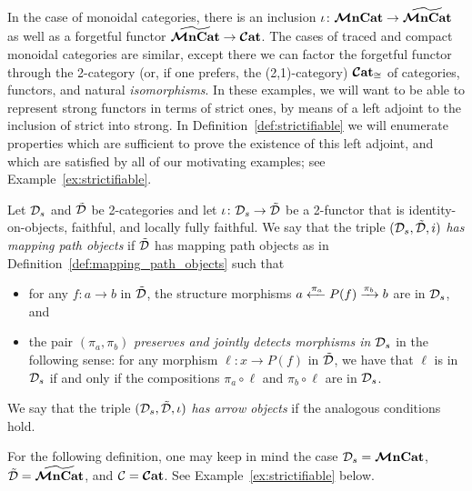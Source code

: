 \documentclass[11pt,oneside,article]{memoir}
\begin{document}
In the case of monoidal categories, there is an inclusion $\iota\colon\bm{\mathcal{M}}\mathbf{nCat}\to\widetilde{\bm{\mathcal{M}}\mathbf{nCat}}$ as
well as a forgetful functor $\widetilde{\bm{\mathcal{M}}\mathbf{nCat}}\to\bm{\mathcal{C}}\mathbf{at}$. The cases of traced and compact monoidal
categories are similar, except there we can factor the forgetful functor through the 2-category (or,
if one prefers, the (2,1)-category) $\bm{\mathcal{C}}\mathbf{at}_{\cong}$ of categories, functors, and natural
\emph{isomorphisms}. In these examples, we will want to be able to represent strong functors in
terms of strict ones, by means of a left adjoint to the inclusion of strict into strong. In
Definition~\ref{def:strictifiable} we will enumerate properties which are sufficient to prove the
existence of this left adjoint, and which are satisfied by all of our motivating examples; see
Example~\ref{ex:strictifiable}.

\begin{definition}
      \label{def:preserve_jdetect_strictness}
   Let $\mathcal{D}_s$ and $\tilde{\mathcal{D}}$ be 2-categories and let $\iota\colon\mathcal{D}_s\to\tilde{\mathcal{D}}$ be a
   2-functor that is identity-on-objects, faithful, and locally fully faithful. We say that the
   triple $(\mathcal{D}_s,\tilde{\mathcal{D}},i)$ \emph{has mapping path objects} if $\tilde{\mathcal{D}}$ has mapping path
   objects as in Definition~\ref{def:mapping_path_objects} such that
   \begin{itemize}
      \item for any $f\colon a\to b$ in $\tilde{\mathcal{D}}$, the structure morphisms
         $a\xleftarrow{\pi_a}P(f)\xrightarrow{\pi_b}b$ are in $\mathcal{D}_s$, and
      \item the pair $(\pi_a,\pi_b)$ \emph{preserves and jointly detects morphisms in $\mathcal{D}_s$} in
         the following sense: for any morphism $\ell\colon x\to P(f)$ in $\tilde{\mathcal{D}}$, we have that
         $\ell$ is in $\mathcal{D}_s$ if and only if the compositions $\pi_a\circ\ell$ and
         $\pi_b\circ\ell$ are in $\mathcal{D}_s$.
   \end{itemize}
   We say that the triple $(\mathcal{D}_s,\tilde{\mathcal{D}},\iota)$ \emph{has arrow objects} if the analogous
   conditions hold.
\end{definition}

For the following definition, one may keep in mind the case $\mathcal{D}_s=\bm{\mathcal{M}}\mathbf{nCat}$,
$\tilde{\mathcal{D}}=\widetilde{\bm{\mathcal{M}}\mathbf{nCat}}$, and $\mathcal{C}=\bm{\mathcal{C}}\mathbf{at}$. See Example~\ref{ex:strictifiable} below.
\end{document}

